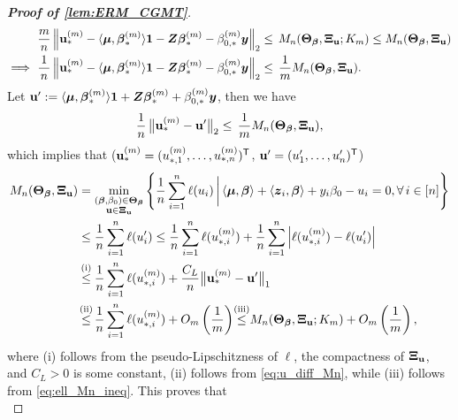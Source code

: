 \begin{proof}[\textbf{Proof of \cref{lem:ERM_CGMT}}]
    \begin{align*}
        & \frac{m}{n} \norm{\bu_*^{(m)} - \< \bmu, \vbeta_*^{(m)} \> \bone - \ZZ \vbeta_*^{(m)} - \beta_{0, *}^{(m)} \yy}_2 \le \, M_n (\bTheta_{\vbeta}, \bXi_{\bu}; K_m) \le M_n (\bTheta_{\vbeta}, \bXi_{\bu}) \\
        \implies \  & \frac{ \mathmakebox[\widthof{$m$}][c]{1} }{n} \norm{\bu_*^{(m)} - \< \bmu, \vbeta_*^{(m)} \> \bone - \ZZ \vbeta_*^{(m)} - \beta_{0, *}^{(m)} \yy}_2 \le \, \frac{1}{m} M_n (\bTheta_{\vbeta}, \bXi_{\bu}).
    \end{align*}
    Let $\mathrm{\bf u}' := \langle \text{\boldmath $\mu$}, {\boldsymbol{\beta}}_*^{(m)} \rangle \mathrm{\bf 1} + \text{\boldmath $Z$} {\boldsymbol{\beta}}_*^{(m)} + \beta_{0, *}^{(m)} \text{\boldmath $y$}$, then we have
    \begin{equation}\label{eq:u_diff_Mn}
        \frac{1}{n} \, \bigl\| \mathrm{\bf u}_*^{(m)} - \mathrm{\bf u}' \bigr\|_2 \le \, \frac{1}{m} M_n (\text{\boldmath $\Theta$}_{{\boldsymbol{\beta}}}, \text{\boldmath $\Xi$}_{\mathrm{\bf u}}),
    \end{equation}
    which implies that ($\mathrm{\bf u}_*^{(m)} = (u_{*, 1}^{(m)}, \ldots, u_{*, n}^{(m)})^{\sf T}$, $\mathrm{\bf u}' = (u'_1, \ldots, u'_n)^{\sf T}$)
    \begin{align*}
        M_n (\bTheta_{\vbeta}, \bXi_{\bu}) 
        & = \min_{ \substack{ (\bbeta , \beta_0) \in \bTheta_{\vbeta} \\  \bu \in \bXi_{\bu} } }
        \left\{
        \frac1n \sum_{i=1}^n \ell( u_i )  \,\bigg|\,
         \< \bmu, \vbeta \> +  \< \zz_i, \vbeta \> + y_i \beta_0 - u_i = 0, \forall\, i \in [n]
         \right\}
        \\
        & \le
        \frac1n \sum_{i=1}^n \ell( u'_i ) \le \frac1n \sum_{i=1}^n \ell( u_{*, i}^{(m)} ) + \frac{1}{n} \sum_{i=1}^{n} \left\vert \ell( u_{*, i}^{(m)} ) - \ell( u'_i ) \right\vert 
        \\
        & \overset{\mathmakebox[0pt][c]{\text{(i)}}}{\le} 
        \frac1n \sum_{i=1}^n \ell( u_{*, i}^{(m)} ) + \frac{C_L}{n} \bigl\| \bu_*^{(m)} - \bu' \bigr\|_1
        \\
        & \overset{\mathmakebox[0pt][c]{\text{(ii)}}}{\le} 
        \frac1n \sum_{i=1}^n \ell( u_{*, i}^{(m)} ) + O_m \left( \frac{1}{m} \right) 
        \overset{\mathmakebox[0pt][c]{\text{(iii)}}}{\le}
        M_n (\bTheta_{\vbeta}, \bXi_{\bu}; K_m) + O_m \left( \frac{1}{m} \right),
    \end{align*}
    where (i) follows from the pseudo-Lipschitzness of $\ell$, the compactness of $\text{\boldmath $\Xi$}_{\mathrm{\bf u}}$, and $C_L > 0$ is some constant, (ii) follows from \cref{eq:u_diff_Mn}, while (iii) follows from \cref{eq:ell_Mn_ineq}.
    This proves that
    \begin{equation*}

\end{equation*}
\end{proof}
